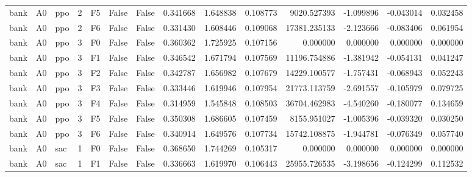 \begin{tabular}{lllrlllrrrrrrr}
      bank &      A0 &       ppo &     2 &  F5 &           False &            False &  0.341668 &  1.648838 & 0.108773 &      9020.527393 &          -1.099896 &       -0.043014 &            0.032458 \\
      bank &      A0 &       ppo &     2 &  F6 &           False &            False &  0.331430 &  1.608446 & 0.109068 &     17381.235133 &          -2.123666 &       -0.083406 &            0.061954 \\
      bank &      A0 &       ppo &     3 &  F0 &           False &            False &  0.360362 &  1.725925 & 0.107156 &         0.000000 &           0.000000 &        0.000000 &            0.000000 \\
      bank &      A0 &       ppo &     3 &  F1 &           False &            False &  0.346542 &  1.671794 & 0.107569 &     11196.754886 &          -1.381942 &       -0.054131 &            0.041247 \\
      bank &      A0 &       ppo &     3 &  F2 &           False &            False &  0.342787 &  1.656982 & 0.107679 &     14229.100577 &          -1.757431 &       -0.068943 &            0.052243 \\
      bank &      A0 &       ppo &     3 &  F3 &           False &            False &  0.333446 &  1.619946 & 0.107954 &     21773.113759 &          -2.691557 &       -0.105979 &            0.079725 \\
      bank &      A0 &       ppo &     3 &  F4 &           False &            False &  0.314959 &  1.545848 & 0.108503 &     36704.462983 &          -4.540260 &       -0.180077 &            0.134659 \\
      bank &      A0 &       ppo &     3 &  F5 &           False &            False &  0.350308 &  1.686605 & 0.107459 &      8155.951027 &          -1.005396 &       -0.039320 &            0.030250 \\
      bank &      A0 &       ppo &     3 &  F6 &           False &            False &  0.340914 &  1.649576 & 0.107734 &     15742.108875 &          -1.944781 &       -0.076349 &            0.057740 \\
      bank &      A0 &       sac &     1 &  F0 &           False &            False &  0.368650 &  1.744269 & 0.105317 &         0.000000 &           0.000000 &        0.000000 &            0.000000 \\
      bank &      A0 &       sac &     1 &  F1 &           False &            False &  0.336663 &  1.619970 & 0.106443 &     25955.726535 &          -3.198656 &       -0.124299 &            0.112532 \\

\end{tabular}
